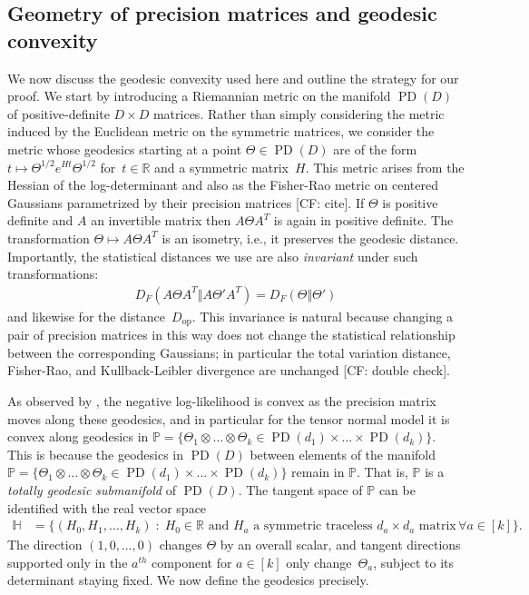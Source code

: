 \documentclass[aos]{imsart}
\theoremstyle{definition}
\numberwithin{equation}{section}
\DeclareMathOperator{\op}{op}
\DeclareMathOperator{\PD}{PD}
\DeclarePairedDelimiter{\norm}{\lVert}{\rVert}
\newcommand{\R}{{\mathbb{R}}}
\renewcommand{\P}{{\mathbb{P}}}
\renewcommand{\H}{{\mathbb{H}}}
\newcommand{\ot}{\otimes}
\newcommand{\CF}[1]{{\color{purple}[CF: #1]}}
\begin{document}
\subsection{Geometry of precision matrices and geodesic convexity}\label{subsec:geom}
We now discuss the geodesic convexity used here and outline the strategy for our proof.
We start by introducing a Riemannian metric on the manifold $\PD(D)$ of positive-definite $D\times D$ matrices.
Rather than simply considering the metric induced by the Euclidean metric on the symmetric matrices, we consider the metric whose geodesics starting at a point $\Theta \in \PD(D)$ are of the form $t \mapsto \Theta^{1/2} e^{Ht} \Theta^{1/2}$ for~$t \in \R$ and a symmetric matrix~$H$. %
This metric arises from the Hessian of the log-determinant \citep{bhatia2009positive} and also as the Fisher-Rao metric on centered Gaussians parametrized by their precision matrices \CF{cite}.
If $\Theta$ is positive definite and $A$ an invertible matrix then $A\Theta A^T$ is again in positive definite.
The transformation $\Theta \mapsto A\Theta A^T$ is an isometry, i.e., it preserves the geodesic distance.
Importantly, the statistical distances we use are also \emph{invariant} under such transformations:
\begin{align*}
  D_F(A \Theta A^T \Vert A \Theta' A^T) = D_F(\Theta \Vert \Theta')
\end{align*}
and likewise for the distance~$D_{\op}$.
This invariance is natural because changing a pair of precision matrices in this way does not change the statistical relationship between the corresponding Gaussians; in particular the total variation distance, Fisher-Rao, and Kullback-Leibler divergence are unchanged \CF{double check}.

As observed by \cite{wiesel2012geodesic}, the negative log-likelihood is convex as the precision matrix moves along these geodesics, and in particular for the tensor normal model it is convex along geodesics in $\P = \{ \Theta_1 \ot \dots \ot \Theta_k \in \PD(d_1) \times \dots \times \PD(d_k) \}$. This is because the geodesics in $\PD(D)$ between elements of the manifold $\P = \{ \Theta_1 \ot \dots \ot \Theta_k \in \PD(d_1) \times \dots \times \PD(d_k) \}$ remain in $\P$. That is, $\P$ is a \emph{totally geodesic submanifold} of $\PD(D)$.  The tangent space of $\P$ can be identified with the real vector space
\begin{align*}
  \H &= \{ (H_0, H_1,\dots,H_k) \;:\; H_0 \in \R \text{ and }H_a \text{ a symmetric traceless $d_a \times d_a$ matrix} \, \forall a \in [k]  \}.
\end{align*}
The direction $(1, 0, \dots, 0)$ changes $\Theta$ by an overall scalar, and tangent directions supported only in the $a^{th}$ component for $a \in [k]$ only change~$\Theta_a$, subject to its determinant staying fixed. We now define the geodesics precisely.
\end{document}
